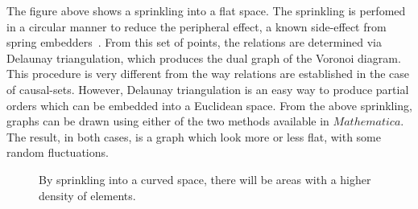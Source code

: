\documentclass[a4paper,12pt]{article}
\numberwithin{equation}{section}
\begin{document}
The figure above shows a sprinkling into a flat space. The sprinkling is perfomed in a circular manner to reduce the peripheral effect, a known side-effect from spring embedders~\cite{Hu2005}. From this set of points, the relations are determined via Delaunay triangulation, which produces the dual graph of the Voronoi diagram. This procedure is very different from the way relations are established in the case of causal-sets. However, Delaunay triangulation is an easy way to produce partial orders which can be embedded into a Euclidean space. From the above sprinkling, graphs can be drawn using either of the two methods available in $Mathematica$. The result, in both cases, is a graph which look more or less flat, with some random fluctuations.

\begin{figure}[h]
\begin{center}
\hspace{2cm}
\hspace{2mm}
\captionsetup{width=400pt}
\caption{By sprinkling into a curved space, there will be areas with a higher density of elements.}
\label{fig:Graph4 and Graph5}
\end{center}
\end{figure}
\end{document}
